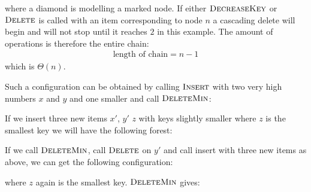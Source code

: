 \documentclass[oneside,11pt,openright]{report}
\newcommand{\BigT}[1]{\ensuremath{\Theta\left(#1\right)}}
\newcommand{\Insert}{\textsc{Insert}}
\newcommand{\DeleteMin}{\textsc{DeleteMin}}
\newcommand{\DecreaseKey}{\textsc{DecreaseKey}}
\newcommand{\Delete}{\textsc{Delete}}
\begin{document}
where a diamond is modelling a marked node. If either $\DecreaseKey$ or $\Delete$ is called with an item corresponding to node $n$ a cascading delete will begin and will not stop until it reaches $2$ in this example. The amount of operations is therefore the entire chain:
\begin{align*}
  \text{length of chain} = n - 1
\end{align*}
which is $\BigT{n}$.

Such a configuration can be obtained by calling $\Insert$ with two very high numbers $x$ and $y$ and one smaller and call $\DeleteMin$:

\begin{center}
\end{center}

If we insert three new items $x'$, $y'$ $z$ with keys slightly smaller where $z$ is the smallest key we will have the following forest:

\begin{center}
\end{center}

If we call $\DeleteMin$, call $\Delete$ on $y'$ and call insert with three new items as above, we can get the following configuration:

\begin{center}
\end{center}
where $z$ again is the smallest key. $\DeleteMin$ gives:
\end{document}
